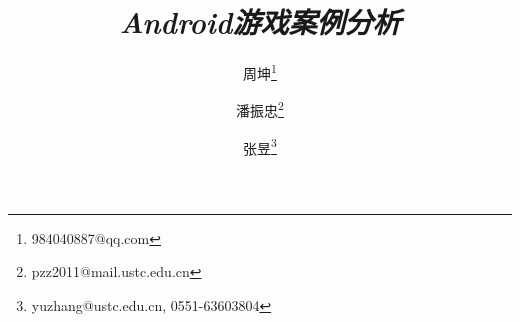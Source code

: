 \documentclass[a4paper,11pt,titlepage]{ctexart}
\begin{document}
\title{\textit{Android游戏案例分析}}
\author{周坤\thanks{984040887@qq.com}}
\author{潘振忠\thanks{pzz2011@mail.ustc.edu.cn}}
\author{张昱\thanks{yuzhang@ustc.edu.cn, 0551-63603804}}

\maketitle
\tableofcontents
\setcounter{tocdepth}{3}
\newpage




%




\end{document}
